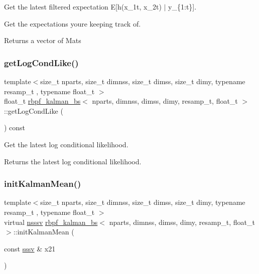 Get the latest filtered expectation E\mbox{[}h(x\+\_\+1t, x\+\_\+2t) $\vert$ y\+\_\+\{1\+:t\}\mbox{]}. 

Get the expectations you\textquotesingle{}re keeping track of. \begin{DoxyReturn}{Returns}
a vector of Mats 
\end{DoxyReturn}
\mbox{\label{classrbpf__kalman__bs_af2ddf0fc3bf89516f3ebc8187b055a57}} 
\subsubsection{\texorpdfstring{get\+Log\+Cond\+Like()}{getLogCondLike()}}
{\footnotesize\ttfamily template$<$size\+\_\+t nparts, size\+\_\+t dimnss, size\+\_\+t dimss, size\+\_\+t dimy, typename resamp\+\_\+t , typename float\+\_\+t $>$ \\
float\+\_\+t \hyperlink{classrbpf__kalman__bs}{rbpf\+\_\+kalman\+\_\+bs}$<$ nparts, dimnss, dimss, dimy, resamp\+\_\+t, float\+\_\+t $>$\+::get\+Log\+Cond\+Like (\begin{DoxyParamCaption}{ }\end{DoxyParamCaption}) const}



Get the latest log conditional likelihood. 

\begin{DoxyReturn}{Returns}
the latest log conditional likelihood. 
\end{DoxyReturn}
\mbox{\label{classrbpf__kalman__bs_a8bb7a29b1bcc66cfb4ebf86c0d091ec1}} 
\subsubsection{\texorpdfstring{init\+Kalman\+Mean()}{initKalmanMean()}}
{\footnotesize\ttfamily template$<$size\+\_\+t nparts, size\+\_\+t dimnss, size\+\_\+t dimss, size\+\_\+t dimy, typename resamp\+\_\+t , typename float\+\_\+t $>$ \\
virtual \hyperlink{classrbpf__kalman__bs_a896c6ca25182e5569df4bfa6c40f9a54}{nsssv} \hyperlink{classrbpf__kalman__bs}{rbpf\+\_\+kalman\+\_\+bs}$<$ nparts, dimnss, dimss, dimy, resamp\+\_\+t, float\+\_\+t $>$\+::init\+Kalman\+Mean (\begin{DoxyParamCaption}\item[{const \hyperlink{classrbpf__kalman__bs_a2b40c9fa0d7a2ca42be3d0c43db0db8b}{sssv} \&}]{x21 }\end{DoxyParamCaption})\hspace{0.3cm}{\ttfamily [pure virtual]}}



